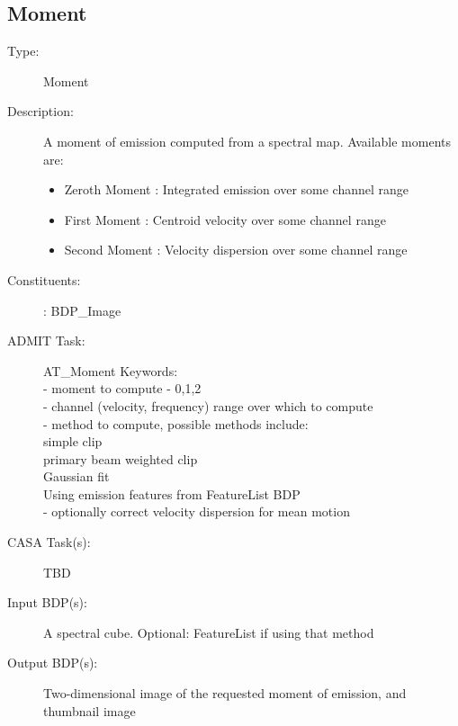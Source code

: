 \subsection{Moment}
\begin{description}
\item[Type:] Moment
\item[Description:]
 A moment of emission computed from a spectral map.  Available moments 
 are:
 \begin{itemize}
 \item Zeroth Moment : Integrated emission over some channel range
 \item First Moment :  Centroid velocity over some channel range
 \item Second Moment : Velocity dispersion over some channel range
 \end{itemize}

\item[Constituents:]: BDP\_Image

\item[ADMIT Task:] AT\_Moment
  Keywords:  \\
     - moment to compute - 0,1,2 \\
     - channel (velocity, frequency) range over which to compute \\
     - method to compute, possible methods include:\\
           simple clip  \\
           primary beam weighted clip \\
           Gaussian fit  \\
           Using emission features from FeatureList BDP \\
     - optionally correct velocity dispersion for mean motion \\
    
\item[CASA Task(s):]  TBD

\item[Input BDP(s):]
A spectral cube.  Optional: FeatureList if using that method

\item[Output BDP(s):]

Two-dimensional image of the requested moment of emission, and thumbnail image

\end{description}
